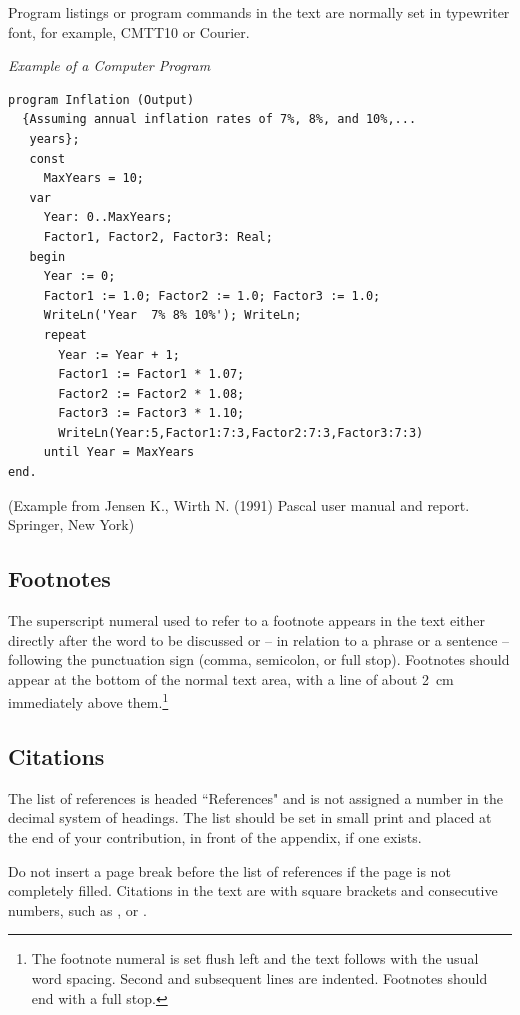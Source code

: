 \documentclass[runningheads]{llncs}
\begin{document}
Program listings or program commands in the text are normally set in
typewriter font, for example, CMTT10 or Courier.

\medskip

\noindent
{\it Example of a Computer Program}
\begin{verbatim}
program Inflation (Output)
  {Assuming annual inflation rates of 7%, 8%, and 10%,...
   years};
   const
     MaxYears = 10;
   var
     Year: 0..MaxYears;
     Factor1, Factor2, Factor3: Real;
   begin
     Year := 0;
     Factor1 := 1.0; Factor2 := 1.0; Factor3 := 1.0;
     WriteLn('Year  7% 8% 10%'); WriteLn;
     repeat
       Year := Year + 1;
       Factor1 := Factor1 * 1.07;
       Factor2 := Factor2 * 1.08;
       Factor3 := Factor3 * 1.10;
       WriteLn(Year:5,Factor1:7:3,Factor2:7:3,Factor3:7:3)
     until Year = MaxYears
end.
\end{verbatim}
%
\noindent
{\small (Example from Jensen K., Wirth N. (1991) Pascal user manual and
report. Springer, New York)}

\subsection{Footnotes}

The superscript numeral used to refer to a footnote appears in the text
either directly after the word to be discussed or -- in relation to a
phrase or a sentence -- following the punctuation sign (comma,
semicolon, or full stop). Footnotes should appear at the bottom of
the
normal text area, with a line of about 2~cm
immediately above them.\footnote
{
   The footnote numeral is set flush left
   and the text follows with the usual word spacing. Second and subsequent
   lines are indented. Footnotes should end with a full stop.
}

\subsection{Citations}

The list of references is headed ``References" and is not assigned a
number
in the decimal system of headings. The list should be set in small print
and placed at the end of your contribution, in front of the appendix,
if one exists.

Do not insert a page break before the list of references if the
page is not completely filled.
Citations in the text are with
square brackets and consecutive numbers, such as \cite{Alpher02}, or
\cite{Alpher03,Herman04,Wills99}.
\end{document}
